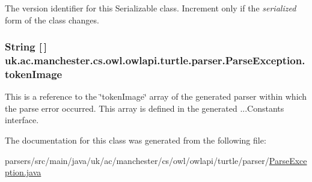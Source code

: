 The version identifier for this Serializable class. Increment only if the {\itshape serialized} form of the class changes. \hypertarget{classuk_1_1ac_1_1manchester_1_1cs_1_1owl_1_1owlapi_1_1turtle_1_1parser_1_1_parse_exception_aabd598309c7cc746f65237927c4cb3a1}{
\subsubsection[{token\-Image}]{\setlength{\rightskip}{0pt plus 5cm}String \mbox{[}$\,$\mbox{]} uk.\-ac.\-manchester.\-cs.\-owl.\-owlapi.\-turtle.\-parser.\-Parse\-Exception.\-token\-Image}}\label{classuk_1_1ac_1_1manchester_1_1cs_1_1owl_1_1owlapi_1_1turtle_1_1parser_1_1_parse_exception_aabd598309c7cc746f65237927c4cb3a1}
This is a reference to the \char`\"{}token\-Image\char`\"{} array of the generated parser within which the parse error occurred. This array is defined in the generated ...Constants interface. 

The documentation for this class was generated from the following file\-:\begin{DoxyCompactItemize}
\item 
parsers/src/main/java/uk/ac/manchester/cs/owl/owlapi/turtle/parser/\hyperlink{uk_2ac_2manchester_2cs_2owl_2owlapi_2turtle_2parser_2_parse_exception_8java}{Parse\-Exception.\-java}\end{DoxyCompactItemize}
